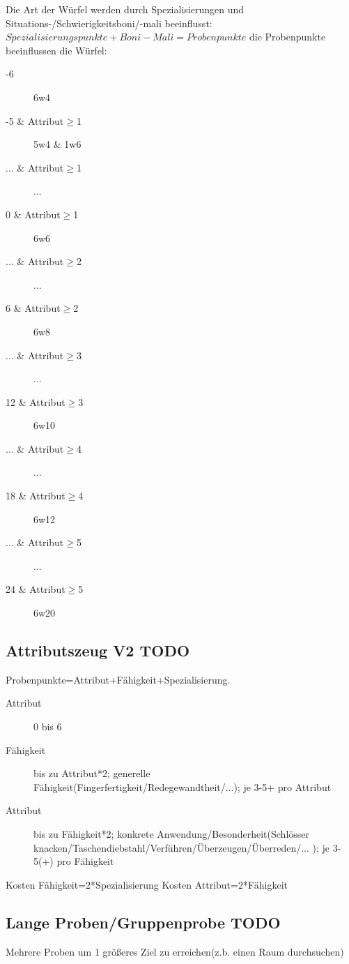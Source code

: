 Die Art der Würfel werden durch Spezialisierungen und Situations-/Schwierigkeitsboni/-mali beeinflusst: $Spezialisierungspunkte+Boni-Mali=Probenpunkte$ die Probenpunkte beeinflussen die Würfel:
\begin{description}
\item[-6] 6w4
\item[-5 \& Attribut$\geq$1] 5w4 \& 1w6
\item[... \& Attribut$\geq$1] ...
\item[0 \& Attribut$\geq$1] 6w6
\item[... \& Attribut$\geq$2] ...
\item[6 \& Attribut$\geq$2] 6w8
\item[... \& Attribut$\geq$3] ...
\item[12 \& Attribut$\geq$3] 6w10
\item[... \& Attribut$\geq$4] ...
\item[18 \& Attribut$\geq$4] 6w12
\item[... \& Attribut$\geq$5] ...
\item[24 \& Attribut$\geq$5] 6w20
\end{description}

\subsection{Attributszeug V2 TODO}
Probenpunkte=Attribut+Fähigkeit+Spezialisierung.

\begin{description}
\item[Attribut] 0 bis 6
\item[Fähigkeit] bis zu Attribut*2; generelle Fähigkeit(Fingerfertigkeit/Redegewandtheit/...); je 3-5+ pro Attribut
\item[Attribut] bis zu Fähigkeit*2; konkrete Anwendung/Besonderheit(Schlösser knacken/Taschendiebstahl/Verführen/Überzeugen/Überreden/... ); je 3-5(+) pro Fähigkeit
\end{description}

Kosten Fähigkeit=2*Spezialisierung
Kosten Attribut=2*Fähigkeit

\subsection{Lange Proben/Gruppenprobe TODO}
Mehrere Proben um 1 größeres Ziel zu erreichen(z.b. einen Raum durchsuchen)

